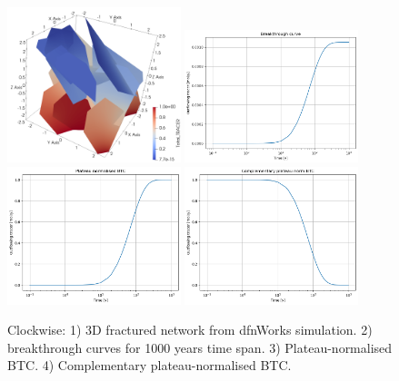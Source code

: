 \documentclass{article}
\begin{document}
\begin{figure}[htbp!]
    \centering
    \includegraphics[width=0.45\textwidth]{images/dfnWorksImages/3DdfnDiffEugV4.png}
    \hspace{0.05\textwidth}
    \includegraphics[width=0.45\textwidth]{images/dfnWorksImages/btcFrom3DeugV4.png}
    \vspace{0.05\textwidth}
    \includegraphics[width=0.45\textwidth]{images/dfnWorksImages/btcFrom3DeugV4norm.png}
    \hspace{0.05\textwidth}
    \includegraphics[width=0.45\textwidth]{images/dfnWorksImages/complementaryBtcFrom3DeugV4norm.png}
    \caption{Clockwise: 1) 3D fractured network from dfnWorks simulation. 2) breakthrough curves for 1000 years time span. 3) Plateau-normalised BTC. 4) Complementary plateau-normalised BTC.}
    \label{fig:3DdfnWorksEugV4}
\end{figure}
\end{document}
